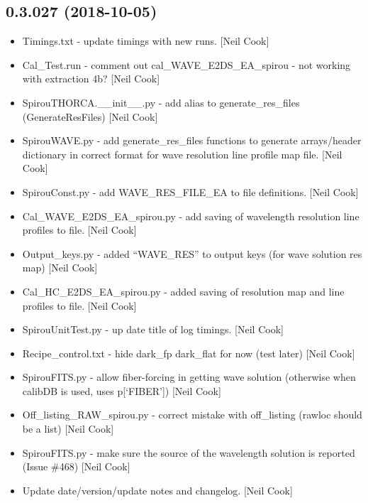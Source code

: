 \documentclass[a4paper,10pt,english]{report}
\begin{document}
\subsection{0.3.027 (2018-10-05)}
\label{\detokenize{misc/changelog:id303}}\begin{itemize}
\item {} 
Timings.txt - update timings with new runs. {[}Neil Cook{]}

\item {} 
Cal\_Test.run - comment out cal\_WAVE\_E2DS\_EA\_spirou - not working with
extraction 4b? {[}Neil Cook{]}

\item {} 
SpirouTHORCA.\_\_init\_\_.py - add alias to generate\_res\_files
(GenerateResFiles) {[}Neil Cook{]}

\item {} 
SpirouWAVE.py - add generate\_res\_files functions to generate
arrays/header dictionary in correct format for wave resolution line
profile map file. {[}Neil Cook{]}

\item {} 
SpirouConst.py - add WAVE\_RES\_FILE\_EA to file definitions. {[}Neil Cook{]}

\item {} 
Cal\_WAVE\_E2DS\_EA\_spirou.py - add saving of wavelength resolution line
profiles to file. {[}Neil Cook{]}

\item {} 
Output\_keys.py - added “WAVE\_RES” to output keys (for wave solution
res map) {[}Neil Cook{]}

\item {} 
Cal\_HC\_E2DS\_EA\_spirou.py - added saving of resolution map and line
profiles to file. {[}Neil Cook{]}

\item {} 
SpirouUnitTest.py - up date title of log timings. {[}Neil Cook{]}

\item {} 
Recipe\_control.txt - hide dark\_fp dark\_flat for now (test later) {[}Neil
Cook{]}

\item {} 
SpirouFITS.py - allow fiber-forcing in getting wave solution
(otherwise when calibDB is used, uses p{[}‘FIBER’{]}) {[}Neil Cook{]}

\item {} 
Off\_listing\_RAW\_spirou.py - correct mistake with off\_listing (rawloc
should be a list) {[}Neil Cook{]}

\item {} 
SpirouFITS.py - make sure the source of the wavelength solution is
reported (Issue \#468) {[}Neil Cook{]}

\item {} 
Update date/version/update notes and changelog. {[}Neil Cook{]}

\end{itemize}
\end{document}

